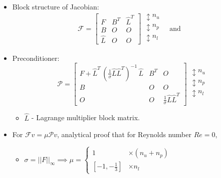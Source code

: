 \documentclass{beamer}
\begin{document}
\newcommand{\genjac}{\mathcal{F}}
\newcommand{\nsjac}{F_{NS}}
\begin{frame}

\begin{itemize}
\item Block structure of Jacobian:
\begin{equation*}
\genjac = 
  \begin{bmatrix}
    F & B^T & \widehat{L}^T\\
    B & \mathit{O} & \mathit{O} \\
    \widehat{L} & \mathit{O} & \mathit{O}
  \end{bmatrix}
\begin{array}{c}
 \updownarrow n_u\\ 
 \updownarrow n_p\\
 \updownarrow n_l\\
\end{array}
\quad \mbox{and} \quad
\end{equation*}
\item Preconditioner:
\begin{equation*}
\mathcal{P} = 
  \begin{bmatrix}
    F + \widehat{L}^T\,(\frac{1}{\sigma}\widehat{L}\widehat{L}^T)^{-1}\,\widehat{L}& B^T & \mathit{O}\\
    B & \mathit{O} & \mathit{O} \\
    \mathit{O} & \mathit{O} & \frac{1}{\sigma}\widehat{L}\widehat{L}^T
  \end{bmatrix}
\begin{array}{c}
 \updownarrow n_u\\ 
 \updownarrow n_p\\
 \updownarrow n_l\\
\end{array}
\end{equation*}
\begin{itemize} 
\item $\widehat{L}$ - Lagrange multiplier block matrix.
\end{itemize}
\item For $\mathcal{F}v = \mu\mathcal{P}v$, analytical proof that for
  Reynolds number $Re = 0$,
  \begin{itemize}
  \item  $\sigma = ||F||_{\infty} \implies 
  \mu = \begin{cases}
   1   & \times (n_u + n_p) \\
   [-1,-\frac{1}{3}]  & \times n_l
  \end{cases} $
  \end{itemize}
\end{itemize}
\end{frame}
\end{document}
